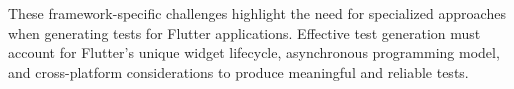 \hspace{0.5cm} These framework-specific challenges highlight the need for specialized approaches when generating tests for Flutter applications. Effective test generation must account for Flutter's unique widget lifecycle, asynchronous programming model, and cross-platform considerations to produce meaningful and reliable tests.




